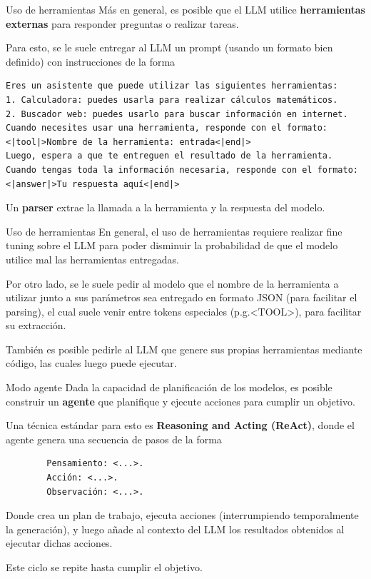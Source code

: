 \documentclass{beamer}
\begin{document}
\begin{frame}[fragile]{Uso de herramientas}
    Más en general, es posible que el LLM utilice \textbf{herramientas externas} para responder preguntas o realizar tareas.

    Para esto, se le suele entregar al LLM un prompt (usando un formato bien definido) con instrucciones de la forma

    \scriptsize
    \begin{verbatim}
Eres un asistente que puede utilizar las siguientes herramientas:
1. Calculadora: puedes usarla para realizar cálculos matemáticos.
2. Buscador web: puedes usarlo para buscar información en internet.
Cuando necesites usar una herramienta, responde con el formato:
<|tool|>Nombre de la herramienta: entrada<|end|>
Luego, espera a que te entreguen el resultado de la herramienta.
Cuando tengas toda la información necesaria, responde con el formato:
<|answer|>Tu respuesta aquí<|end|>
\end{verbatim}

    \normalsize
    Un \textbf{parser} extrae la llamada a la herramienta y la respuesta del modelo.
\end{frame}

\begin{frame}{Uso de herramientas}
    En general, el uso de herramientas requiere realizar fine tuning sobre el LLM para poder disminuir la probabilidad de que el modelo utilice mal las herramientas entregadas.

    Por otro lado, se le suele pedir al modelo que el nombre de la herramienta a utilizar junto a sus parámetros sea entregado en formato JSON (para facilitar el parsing), el cual suele venir entre tokens especiales (p.g.$\text{<TOOL>}$), para facilitar su extracción.

    También es posible pedirle al LLM que genere sus propias herramientas mediante código, las cuales luego puede ejecutar.
\end{frame}

\begin{frame}[fragile]{Modo agente}
    Dada la capacidad de planificación de los modelos, es posible construir un \textbf{agente} que planifique y ejecute acciones para cumplir un objetivo.

    Una técnica estándar para esto es \textbf{Reasoning and Acting (ReAct)}, donde el agente genera una secuencia de pasos de la forma

    \small
    \begin{verbatim}
        Pensamiento: <...>.
        Acción: <...>.
        Observación: <...>.
    \end{verbatim}
    \vspace{-0.5cm}
    Donde crea un plan de trabajo, ejecuta acciones (interrumpiendo temporalmente la generación), y luego añade al contexto del LLM los resultados obtenidos al ejecutar dichas acciones.

    Este ciclo se repite hasta cumplir el objetivo.
\end{frame}
\end{document}
